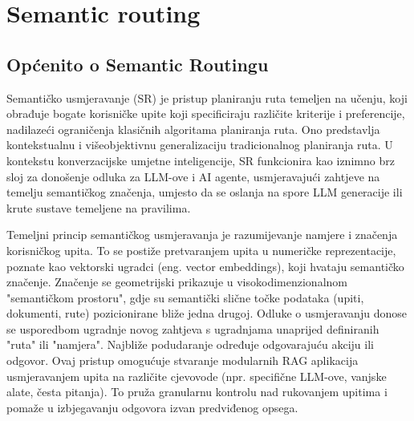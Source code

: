 \section{Semantic routing}
\subsection{Općenito o Semantic Routingu}

Semantičko usmjeravanje (SR) je pristup planiranju ruta temeljen na učenju, koji obrađuje bogate korisničke upite koji specificiraju različite kriterije i preferencije, nadilazeći ograničenja klasičnih algoritama planiranja ruta. Ono predstavlja kontekstualnu i višeobjektivnu generalizaciju tradicionalnog planiranja ruta. U kontekstu konverzacijske umjetne inteligencije, SR funkcionira kao iznimno brz sloj za donošenje odluka za LLM-ove i AI agente, usmjeravajući zahtjeve na temelju semantičkog značenja, umjesto da se oslanja na spore LLM generacije ili krute sustave temeljene na pravilima.

Temeljni princip semantičkog usmjeravanja je razumijevanje namjere i značenja korisničkog upita. To se postiže pretvaranjem upita u numeričke reprezentacije, poznate kao vektorski ugradci (eng. vector embeddings), koji hvataju semantičko značenje. Značenje se geometrijski prikazuje u visokodimenzionalnom "semantičkom prostoru", gdje su semantički slične točke podataka (upiti, dokumenti, rute) pozicionirane bliže jedna drugoj. Odluke o usmjeravanju donose se usporedbom ugradnje novog zahtjeva s ugradnjama unaprijed definiranih "ruta" ili "namjera". Najbliže podudaranje određuje odgovarajuću akciju ili odgovor. Ovaj pristup omogućuje stvaranje modularnih RAG aplikacija usmjeravanjem upita na različite cjevovode (npr. specifične LLM-ove, vanjske alate, česta pitanja). To pruža granularnu kontrolu nad rukovanjem upitima i pomaže u izbjegavanju odgovora izvan predviđenog opsega.

